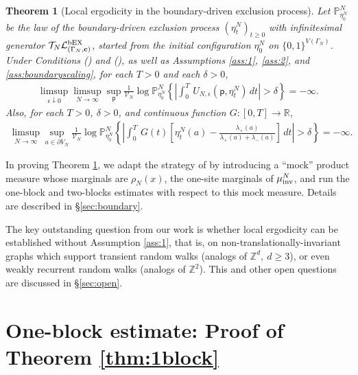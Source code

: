 \documentclass[11pt]{amsart}
\theoremstyle{plain}
\newtheorem{theorem}{Theorem}
\theoremstyle{definition}
\theoremstyle{remark}
\newcommand{\pt}{\mathsf{p}}
\begin{document}
\begin{theorem}[Local ergodicity in the boundary-driven exclusion process]
\label{thm:localergodicboundary}
Let $\mathbb{P}^N_{\eta_0^N}$ be the law of the boundary-driven exclusion process $(\eta_t^N)_{t\geq 0}$ with infinitesimal generator $\mathcal{T}_N \mathcal{L}^{\rm bEX}_{(\Gamma_N, {\bf c})}$, started from the initial configuration $\eta_0^N$ on $\{0,1\}^{V(\Gamma_N)}$. Under Conditions () and (), as well as Assumptions \ref{ass:1}, \ref{ass:2}, and \ref{ass:boundaryscaling},
 for each $T>0$ and each $\delta>0$,
\begin{align}
\label{supexpboundary}
\limsup_{\epsilon\downarrow 0} \limsup_{N\to\infty} \sup_\pt \frac{1}{\mathcal{V}_N} \log \mathbb{P}^N_{\eta_0^N} \left\{ \left|\int_0^T\, U_{N,\epsilon}(\pt,\eta^N_t)\,dt\right|>\delta\right\} = -\infty.
\end{align}
Also, for each $T>0$, $\delta>0$, and continuous function $G:[0,T]\to\mathbb{R}$,
\begin{align}
\label{supexpboundary2}
\limsup_{N\to\infty} \sup_{a\in \partial V_N} \frac{1}{\mathcal{V}_N} \log\mathbb{P}^N_{\eta_0^N}\left\{\left|\int_0^T\, G(t)\left[\eta_t^N(a)-\frac{\lambda_+(a)}{\lambda_+(a)+\lambda_-(a)} \right]\,dt \right| >\delta\right\}=-\infty.
\end{align}
\end{theorem}

In proving Theorem \ref{thm:localergodicboundary}, we adapt the strategy of \cite{BDGJL03} by introducing a ``mock'' product measure whose marginals are $\rho_N(x)$, the one-site marginals of $\mu_{\rm inv}^N$, and run the one-block and two-blocks estimates with respect to this mock measure. Details are described in \S\ref{sec:boundary}.

The key outstanding question from our work is whether local ergodicity can be established without Assumption \ref{ass:1}, that is, on non-translationally-invariant graphs which support transient random walks (analogs of $\mathbb{Z}^d,~d\geq 3$), or even weakly recurrent random walks (analogs of $\mathbb{Z}^2$). This and other open questions are discussed in \S\ref{sec:open}. 








\section{One-block estimate: Proof of Theorem \ref{thm:1block}} \label{sec:1block}
\end{document}
